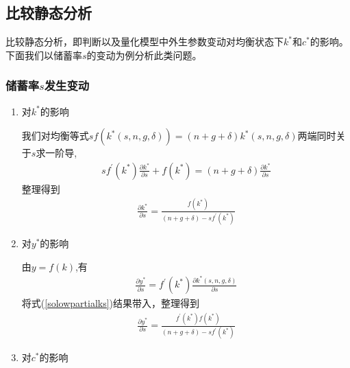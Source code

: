 \documentclass[cn,normal,11pt,black]{elegantnote}
\begin{document}
\subsection{比较静态分析}

比较静态分析，即判断以及量化模型中外生参数变动对均衡状态下$k^*$和$c^*$的影响。
下面我们以储蓄率$s$的变动为例分析此类问题。

\subsubsection*{储蓄率$s$发生变动}
    \begin{enumerate}
        \item 对$k^*$的影响

                我们对均衡等式$s f\left(k^{*}(s, n, g, \delta)\right)=(n+g+\delta) k^{*}(s, n, g, \delta)$两端同时关于$s$求一阶导,
                    \begin{align}
                        s f^{\prime}\left(k^{*}\right) \frac{\partial k^{*}}{\partial s}+f\left(k^{*}\right) = 
                            (n+g+\delta) \frac{\partial k^{*}}{\partial s}
                    \end{align}
                整理得到
                    \begin{align}\label{solowpartialks}
                        \frac{\partial k^{*}}{\partial s} = \frac{f\left(k^{*}\right)}{(n+g+\delta)-s f^{\prime}\left(k^{*}\right)}
                    \end{align} 

        \item 对$y^*$的影响

                由$y=f(k)$,有
                    \begin{align}
                        \frac{\partial y^{*}}{\partial s} = 
                            f^{\prime}\left(k^{*}\right) \frac{\partial k^{*}(s, n, g, \delta)}{\partial s}
                    \end{align}
                将式(\ref{solowpartialks})结果带入，整理得到
                    \begin{align}
                        \frac{\partial y^{*}}{\partial s} = 
                            \frac{f^{\prime}\left(k^{*}\right) f\left(k^{*}\right)}{(n+g+\delta)-s f^{\prime}\left(k^{*}\right)}
                    \end{align}

        \item 对$c^*$的影响


\end{enumerate}
\end{document}
